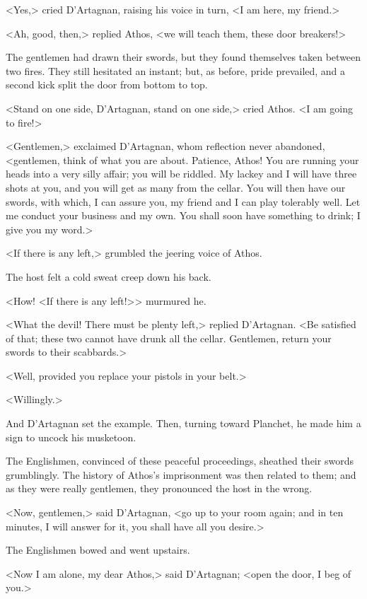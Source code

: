 <Yes,> cried D'Artagnan, raising his voice in turn, <I am here, my friend.> 

<Ah, good, then,> replied Athos, <we will teach them, these door breakers!> 

The gentlemen had drawn their swords, but they found themselves taken between two fires. They still hesitated an instant; but, as before, pride prevailed, and a second kick split the door from bottom to top. 

<Stand on one side, D'Artagnan, stand on one side,> cried Athos. <I am going to fire!> 

<Gentlemen,> exclaimed D'Artagnan, whom reflection never abandoned, <gentlemen, think of what you are about. Patience, Athos! You are running your heads into a very silly affair; you will be riddled. My lackey and I will have three shots at you, and you will get as many from the cellar. You will then have our swords, with which, I can assure you, my friend and I can play tolerably well. Let me conduct your business and my own. You shall soon have something to drink; I give you my word.> 

<If there is any left,> grumbled the jeering voice of Athos. 

The host felt a cold sweat creep down his back. 

<How! <If there is any left!>> murmured he. 

<What the devil! There must be plenty left,> replied D'Artagnan. <Be satisfied of that; these two cannot have drunk all the cellar. Gentlemen, return your swords to their scabbards.> 

<Well, provided you replace your pistols in your belt.> 

<Willingly.> 

And D'Artagnan set the example. Then, turning toward Planchet, he made him a sign to uncock his musketoon. 

The Englishmen, convinced of these peaceful proceedings, sheathed their swords grumblingly. The history of Athos's imprisonment was then related to them; and as they were really gentlemen, they pronounced the host in the wrong. 

<Now, gentlemen,> said D'Artagnan, <go up to your room again; and in ten minutes, I will answer for it, you shall have all you desire.> 

The Englishmen bowed and went upstairs. 

<Now I am alone, my dear Athos,> said D'Artagnan; <open the door, I beg of you.> 

